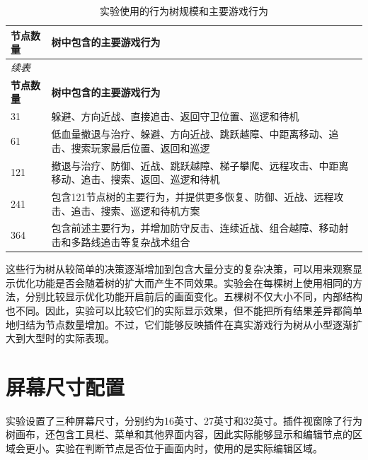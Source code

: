 \documentclass[11pt,a4paper,oneside,extrafontsizes]{memoir}
\begin{document}
\begin{center}

\begin{longtable}{@{}p{} p{}@{}}
\caption{实验使用的行为树规模和主要游戏行为}\label{tab:experiment-tree-sizes}\\
\toprule
\textbf{节点数量} & \textbf{树中包含的主要游戏行为} \\
\midrule
\endfirsthead
\multicolumn{2}{l}{\itshape 续表}\\
\toprule
\textbf{节点数量} & \textbf{树中包含的主要游戏行为} \\
\midrule
\endhead
31 & 躲避、方向近战、直接追击、返回守卫位置、巡逻和待机 \\
61 & 低血量撤退与治疗、躲避、方向近战、跳跃越障、中距离移动、追击、搜索玩家最后位置、返回和巡逻 \\
121 & 撤退与治疗、防御、近战、跳跃越障、梯子攀爬、远程攻击、中距离移动、追击、搜索、返回、巡逻和待机 \\
241 & 包含121节点树的主要行为，并提供更多恢复、防御、近战、远程攻击、追击、搜索、巡逻和待机方案 \\
364 & 包含前述主要行为，并增加防守反击、连续近战、组合越障、移动射击和多路线追击等复杂战术组合 \\
\bottomrule
\end{longtable}
\end{center}

这些行为树从较简单的决策逐渐增加到包含大量分支的复杂决策，可以用来观察显示优化功能是否会随着树的扩大而产生不同效果。实验会在每棵树上使用相同的方法，分别比较显示优化功能开启前后的画面变化。五棵树不仅大小不同，内部结构也不同。因此，实验可以比较它们的实际显示效果，但不能把所有结果差异都简单地归结为节点数量增加。不过，它们能够反映插件在真实游戏行为树从小型逐渐扩大到大型时的实际表现。

\section{屏幕尺寸配置}

实验设置了三种屏幕尺寸，分别约为16英寸、27英寸和32英寸。插件视窗除了行为树画布，还包含工具栏、菜单和其他界面内容，因此实际能够显示和编辑节点的区域会更小。实验在判断节点是否位于画面内时，使用的是实际编辑区域。
\end{document}
